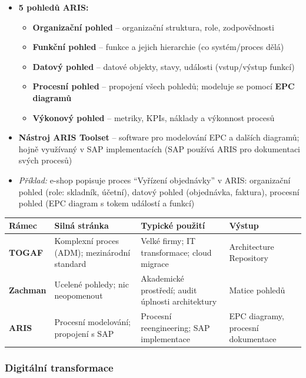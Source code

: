 \begin{itemize}
  \item \textbf{5 pohledů ARIS:}
    \begin{itemize}
      \item \textbf{Organizační pohled} -- organizační struktura, role, zodpovědnosti
      \item \textbf{Funkční pohled} -- funkce a jejich hierarchie (co systém/proces dělá)
      \item \textbf{Datový pohled} -- datové objekty, stavy, události (vstup/výstup funkcí)
      \item \textbf{Procesní pohled} -- propojení všech pohledů; modeluje se pomocí \textbf{EPC diagramů}
      \item \textbf{Výkonový pohled} -- metriky, KPIs, náklady a výkonnost procesů
    \end{itemize}
  \item \textbf{Nástroj ARIS Toolset} -- software pro modelování EPC a dalších diagramů;
    hojně využívaný v SAP implementacích (SAP používá ARIS pro dokumentaci svých procesů)
  \item \textit{Příklad:} e-shop popisuje proces ``Vyřízení objednávky'' v ARIS:
    organizační pohled (role: skladník, účetní), datový pohled (objednávka, faktura),
    procesní pohled (EPC diagram s tokem událostí a funkcí)
\end{itemize}

\begin{center}
\begin{tabular}{p{2.5cm}p{3.8cm}p{3.8cm}p{3cm}}
\toprule
\textbf{Rámec} & \textbf{Silná stránka} & \textbf{Typické použití} & \textbf{Výstup} \\
\midrule
\textbf{TOGAF} & Komplexní proces (ADM); \newline mezinárodní standard & Velké firmy; IT transformace; cloud migrace & Architecture Repository \\
\textbf{Zachman} & Ucelené pohledy; \newline nic neopomenout & Akademické prostředí; audit úplnosti architektury & Matice pohledů \\
\textbf{ARIS} & Procesní modelování; \newline propojení s SAP & Procesní reengineering; SAP implementace & EPC diagramy, procesní dokumentace \\
\bottomrule
\end{tabular}
\end{center}

\subsubsection{Digitální transformace}

